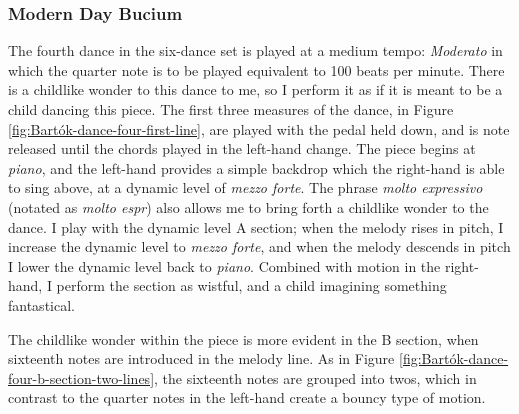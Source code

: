 \subsubsection{Modern Day Bucium}

The fourth dance in the six-dance set is played at a medium tempo: \textit{Moderato} in which the quarter note is to be played equivalent to 100 beats per minute. There is a childlike wonder to this dance to me, so I perform it as if it is meant to be a child dancing this piece. The first three measures of the dance, in Figure \ref{fig:Bartók-dance-four-first-line}\autocite{Lung_2016}, are played with the pedal held down, and is note released until the chords played in the left-hand change. The piece begins at \textit{piano}, and the left-hand provides a simple backdrop which the right-hand is able to sing above, at a dynamic level of \textit{mezzo forte}. The phrase \textit{molto expressivo} (notated as \textit{molto espr}) also allows me to bring forth a childlike wonder to the dance. I play with the dynamic level A section; when the melody rises in pitch, I increase the dynamic level to \textit{mezzo forte}, and when the melody descends in pitch I lower the dynamic level back to \textit{piano}. Combined with motion in the right-hand, I perform the section as wistful, and a child imagining something fantastical.

The childlike wonder within the piece is more evident in the B section, when sixteenth notes are introduced in the melody line. As in Figure \ref{fig:Bartók-dance-four-b-section-two-lines}\autocite{Lung_2016}, the sixteenth notes are grouped into twos, which in contrast to the quarter notes in the left-hand create a bouncy type of motion. 


